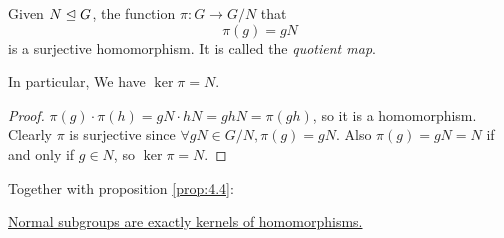 \documentclass[a4paper]{article}
\begin{document}
\begin{theorem}\label{thm:map from group to quotients}
  Given $ N\trianglelefteq G $, the function $ \pi:G\to G/N $ that
  \[
    \pi(g)=gN
  \]
  is a surjective homomorphism. It is called the \textit{quotient map}.

  In particular, We have $ \ker \pi=N $.
\end{theorem}
\begin{proof}
  $ \pi(g)\cdot \pi(h)=gN\cdot hN=ghN=\pi(gh) $, so it is a
  homomorphism. Clearly $ \pi $ is surjective since $ \forall gN\in
  G/N, \pi(g)=gN $. Also $ \pi(g)=gN=N $ if and only if $g\in N$, so
  $ \ker \pi=N $.
\end{proof}
Together with proposition \ref{prop:4.4}:

\underline{Normal subgroups are exactly kernels of homomorphisms.}
\end{document}
